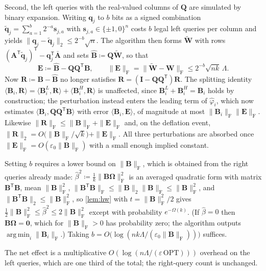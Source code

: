 \documentclass{article}
\renewcommand{\vec}[1]{\mathbf{#1}}          %
\newcommand{\T}{\mathsf{T}}                  %
\newcommand{\F}{\mathrm{F}}                  %
\newcommand{\eps}{\varepsilon}
\newcommand{\OPT}{\mathrm{OPT}}
\newcommand{\inner}[2]{\langle #1, #2 \rangle}
\DeclareMathOperator*{\argmin}{arg\,min}
\theoremstyle{remark}
\begin{document}
Second, the left queries with the real-valued columns of $\vec{Q}$ are simulated by binary expansion.
Writing $\vec{q}_j$ to $b$ bits as a signed combination $\tilde{\vec{q}}_j = \sum_{a=1}^{b} 2^{-a}\vec{s}_{j,a}$ with $\vec{s}_{j,a} \in \{\pm1,0\}^n$ costs $b$ legal left queries per column and yields $\|\vec{q}_j - \tilde{\vec{q}}_j\|_2 \le 2^{-b}\sqrt{n}$.
The algorithm then forms $\widetilde{\vec{W}}$ with rows $(\vec{A}^\T\tilde{\vec{q}}_j)^\T - \vec{q}_j^\T\bar{\vec{A}}$ and sets $\widehat{\vec{B}} \coloneqq \vec{Q}\widetilde{\vec{W}}$, so that
\[
\vec{E} \coloneqq \widehat{\vec{B}} - \vec{Q}\vec{Q}^\T\vec{B},
\qquad
\|\vec{E}\|_\F = \|\widetilde{\vec{W}} - \vec{W}\|_\F \le 2^{-b}\sqrt{nk}\,\Lambda .
\]
Now $\vec{R} \coloneqq \vec{B} - \widehat{\vec{B}}$ no longer satisfies $\vec{R} = (\vec{I} - \vec{Q}\vec{Q}^\T)\vec{R}$.
The splitting identity $\inner{\vec{B}_i}{\vec{R}} = \inner{\vec{B}_i^L}{\vec{R}} + \inner{\vec{B}_i^H}{\vec{R}}$ is unaffected, since $\vec{B}_i^L + \vec{B}_i^H = \vec{B}_i$ holds by construction; the perturbation instead enters the leading term of $\hat\varphi_i$, which now estimates $\inner{\vec{B}_i}{\vec{Q}\vec{Q}^\T\vec{B}}$ with error $\inner{\vec{B}_i}{\vec{E}}$, of magnitude at most $\|\vec{B}_i\|_\F \|\vec{E}\|_\F$.
Likewise $\|\vec{R}\|_\F \le \|\vec{B}\|_\F + \|\vec{E}\|_\F$ and, on the deflation event, $\|\vec{R}\|_2 = O\bigl(\|\vec{B}\|_\F/\sqrt{k}\bigr) + \|\vec{E}\|_\F$.
All three perturbations are absorbed once $\|\vec{E}\|_\F = O(\eps_0\|\vec{B}\|_\F)$ with a small enough implied constant.

Setting $b$ requires a lower bound on $\|\vec{B}\|_\F$, which is obtained from the right queries already made: $\widehat{\beta}^2 \coloneqq \frac{1}{k}\|\vec{B}\vec{\Omega}\|_\F^2$ is an averaged quadratic form with matrix $\vec{B}^\T\vec{B}$, mean $\|\vec{B}\|_\F^2$, $\|\vec{B}^\T\vec{B}\|_\F \le \|\vec{B}\|_2\|\vec{B}\|_\F \le \|\vec{B}\|_\F^2$, and $\|\vec{B}^\T\vec{B}\|_2 \le \|\vec{B}\|_\F^2$, so \cref{lem:hw} with $t = \|\vec{B}\|_\F^2/2$ gives $\tfrac12\|\vec{B}\|_\F^2 \le \widehat{\beta}^2 \le 2\|\vec{B}\|_\F^2$ except with probability $e^{-\Omega(k)}$.
(If $\widehat{\beta} = 0$ then $\vec{B}\vec{\Omega} = \vec{0}$, which for $\|\vec{B}\|_\F > 0$ has probability zero; the algorithm outputs $\argmin_i \|\vec{B}_i\|_\F$.)
Taking $b = O\bigl( \log(nk\Lambda/(\eps_0\|\vec{B}\|_\F)) \bigr)$ suffices.

The net effect is a multiplicative $O(\log(n\Lambda/(\eps\,\OPT)))$ overhead on the left queries, which are one third of the total; the right-query count is unchanged.
\end{document}
